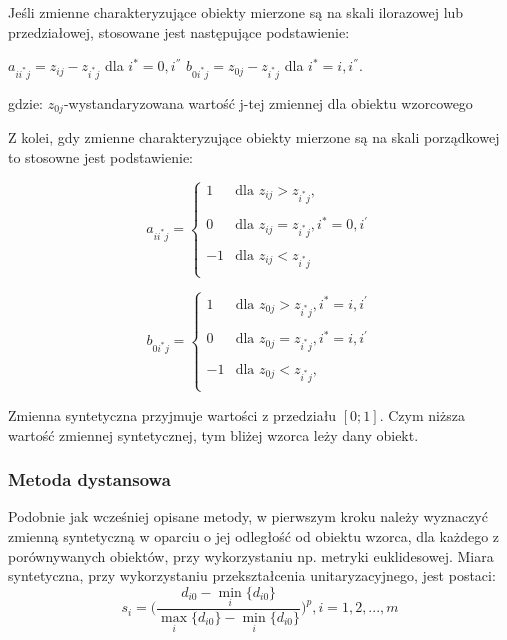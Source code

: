 \documentclass[12pt,a4paper]{report}
\begin{document}
Jeśli zmienne charakteryzujące obiekty mierzone są na skali ilorazowej lub przedziałowej, stosowane jest następujące podstawienie:
\begin{center}
$a_{ii^{*}j}=z_{ij} - z_{i^{*}j}$ dla $i^{*}=0,i^{''}$
$b_{0i^{*}j}=z_{0j}-z_{i^*j}$ dla $i^{*}=i,i^{''}$.
\end{center}
gdzie:
\newline
$z_{0j}$-wystandaryzowana wartość j-tej zmiennej dla obiektu wzorcowego

Z kolei, gdy zmienne charakteryzujące obiekty mierzone są na skali porządkowej to stosowne jest podstawienie:

\begin{equation}
a_{ii^{*}j}=\left\{ \begin{array}{lll}
1  & \textrm{dla  } z_{ij}>z_{i^{*}j},\\\\
0 & \textrm{dla } z_{ij}=z_{i^{*}j}, i^{*}=0,i^{'}\\\\
-1 & \textrm{dla } z_{ij}<z_{i^{*}j}\\
\end{array} \right.
\end{equation}

\begin{equation}
b_{0i^{*}j}=\left\{ \begin{array}{lll}
1  & \textrm{dla  } z_{0j}>z_{i^{*}j}, i^{*}=i,i^{'}\\\\
0 & \textrm{dla } z_{0j}=z_{i^{*}j}, i^{*}=i,i^{'}\\\\
-1 & \textrm{dla } z_{0j}<z_{i^{*}j},\\
\end{array} \right.
\end{equation}

Zmienna syntetyczna przyjmuje wartości z przedziału $[0;1]$. Czym niższa wartość zmiennej syntetycznej, tym bliżej wzorca leży dany obiekt.

\subsubsection{Metoda dystansowa}
\noindent

Podobnie jak wcześniej opisane metody, w pierwszym kroku należy wyznaczyć zmienną syntetyczną w oparciu o jej odległość od obiektu wzorca, dla każdego z porównywanych obiektów, przy wykorzystaniu np. metryki euklidesowej. Miara syntetyczna, przy wykorzystaniu przekształcenia unitaryzacyjnego, jest postaci: 
\newline
\begin{equation}
s_{i}=\bigg(\frac{d_{i0}-\min\limits_{i}\{d_{i0}\}}{\max\limits_{i}\{d_{i0}\}-\min\limits_{i}\{d_{i0}\}} \bigg)^{p}, i=1,2,...,m
\end{equation}
\end{document}
